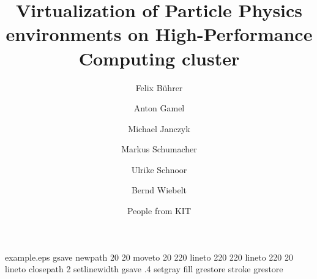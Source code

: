 %
%
%
%
%
\begin{filecontents*}{example.eps}
gsave
newpath
  20 20 moveto
  20 220 lineto
  220 220 lineto
  220 20 lineto
closepath
2 setlinewidth
gsave
  .4 setgray fill
grestore
stroke
grestore
\end{filecontents*}
%
\RequirePackage{fix-cm}
%
\documentclass[twocolumn]{svjour3}          %
%
\smartqed  %
%
\usepackage{graphicx}
%
%
\usepackage{url}
%
%
%


\title{Virtualization of Particle Physics environments on
  High-Performance Computing cluster%
}


\author{Felix B\"uhrer \and Anton Gamel  \and Michael Janczyk \and
  Markus Schumacher \and
  Ulrike Schnoor \and Bernd Wiebelt \and People from KIT
}

